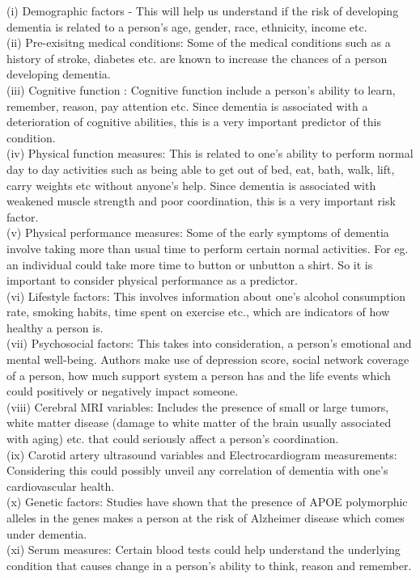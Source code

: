 \documentclass[12pt,letterpaper]{article}
\begin{document}
(i) Demographic factors - This will help us understand if the risk of developing dementia is related to a person's age, gender, race, ethnicity, income etc.\\
(ii) Pre-exisitng medical conditions: Some of the medical conditions such as a history of stroke, diabetes etc. are known to increase the chances of a person developing dementia. \\
(iii)  Cognitive function : Cognitive function include a person's ability to learn, remember, reason, pay attention etc.  Since dementia is associated with a deterioration of cognitive abilities, this is a very important predictor of this condition. \\
(iv) Physical function measures: This is related to one's ability to perform normal day to day activities such as being able to get out of bed, eat, bath, walk, lift, carry weights etc without anyone's help. Since dementia is associated with weakened muscle strength and poor coordination, this is a very important risk factor. \\
(v) Physical performance measures: Some of the early symptoms of dementia involve taking more than usual time to perform certain normal activities. For eg. an individual could take more time to button or unbutton a shirt. So it is important to consider physical performance as a predictor.\\
(vi) Lifestyle factors: This involves information about one's alcohol consumption rate, smoking habits, time spent on exercise etc., which are indicators of how healthy a person is. \\
(vii) Psychosocial factors: This takes into consideration, a person's emotional and mental well-being. Authors make use of depression score, social network coverage of a person, how much support system a person has and the life events which could positively or negatively impact someone. \\
(viii) Cerebral MRI variables: Includes the presence of small or large tumors, white matter disease (damage to white matter of the brain usually associated with aging) etc. that could seriously affect a person's coordination.\\
(ix) Carotid artery ultrasound variables and Electrocardiogram measurements: Considering this could possibly unveil any correlation of dementia with one's cardiovascular health.\\
(x) Genetic factors: Studies have shown that the presence of APOE polymorphic alleles in the genes makes a person at the risk of Alzheimer disease which comes under dementia.\\
(xi) Serum measures: Certain blood tests could help understand the underlying condition that causes change in a person's ability to think, reason and remember. \\
\end{document}
